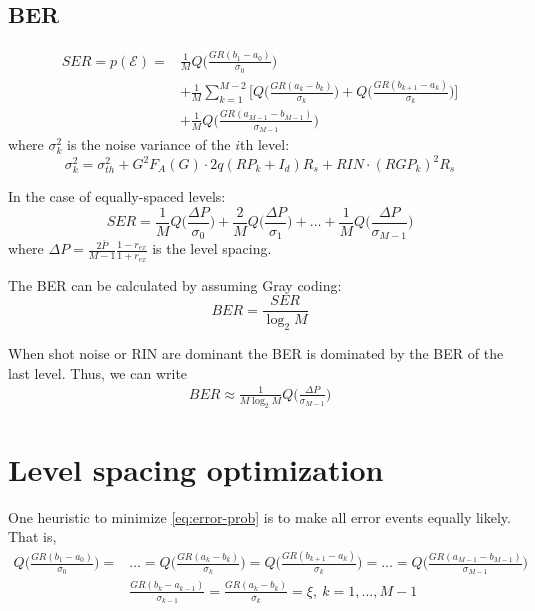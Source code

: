 \documentclass[a4paper]{article}
\begin{document}
\subsection{BER}

\begin{align} \label{eq:error-prob} \nonumber
SER = p(\mathcal{E}) = &\frac{1}{M}Q\bigg(\frac{GR(b_1 - a_0)}{\sigma_{0}}\bigg) \\ \nonumber 
& + \frac{1}{M}\sum_{k=1}^{M-2}\Bigg[Q\bigg(\frac{GR(a_k-b_k)}{\sigma_{k}}\bigg) + Q\bigg(\frac{GR(b_{k+1}-a_k)}{\sigma_{k}}\bigg)\Bigg] \\
& + \frac{1}{M}Q\bigg(\frac{GR(a_{M-1}-b_{M-1})}{\sigma_{M-1}}\bigg)
\end{align}
where $\sigma_{k}^2$ is the noise variance of the $i$th level:
\begin{equation}
\sigma_{k}^2 = \sigma_{th}^2 + G^2F_A(G)\cdot 2q(RP_{k} + I_d)R_s + RIN\cdot (RGP_{k})^2R_s 
\end{equation}

In the case of equally-spaced levels:
\begin{equation}
SER = \frac{1}{M}Q\bigg(\frac{\Delta P}{\sigma_{0}}\bigg) + \frac{2}{M}Q\bigg(\frac{\Delta P}{\sigma_{1}}\bigg) + \ldots + \frac{1}{M}Q\bigg(\frac{\Delta P}{\sigma_{M-1}}\bigg)
\end{equation}
where $\Delta P = \frac{2\bar{P}}{M-1}\frac{1-r_{ex}}{1 + r_{ex}}$ is the level spacing.

The BER can be calculated by assuming Gray coding:
\begin{equation}
BER = \frac{SER}{\log_2 M}
\end{equation}

When shot noise or RIN are dominant the BER is dominated by the BER of the last level. Thus, we can write
\begin{align}
BER \approx \frac{1}{M\log_2 M}Q\bigg(\frac{\Delta P}{\sigma_{M-1}}\bigg)
\end{align}


\section{Level spacing optimization}

One heuristic to minimize \eqref{eq:error-prob} is to make all error events equally likely. That is,
\begin{align} \label{eq:level-opt-condition} \nonumber
Q\bigg(\frac{GR(b_1 - a_0)}{\sigma_{0}}\bigg) =& \ldots = Q\bigg(\frac{GR(a_k-b_k)}{\sigma_{k}}\bigg) = Q\bigg(\frac{GR(b_{k+1}-a_k)}{\sigma_{k}}\bigg) = \ldots = Q\bigg(\frac{GR(a_{M-1}-b_{M-1})}{\sigma_{M-1}}\bigg) \\
& \frac{GR(b_k-a_{k-1})}{\sigma_{k-1}} = \frac{GR(a_{k}-b_k)}{\sigma_{k}} = \xi,~k = 1, \ldots, M-1
\end{align}
\end{document}
